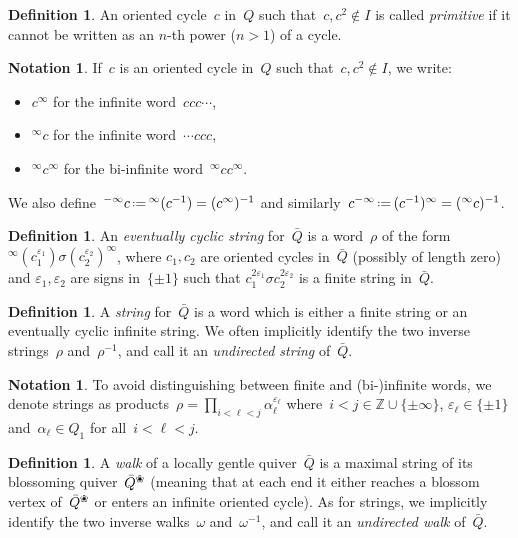 \documentclass{amsart}
\theoremstyle{definition}
\newtheorem{definition}[theorem]{Definition}
\newtheorem{notation}[theorem]{Notation}
\newcommand{\Z}{\mathbb{Z}} %
\newcommand{\eqdef}{\mbox{\,\raisebox{0.2ex}{\scriptsize\ensuremath{\mathrm:}}\ensuremath{=}\,}} %
\newcommand{\darkblue}{\color{darkblue}} %
\newcommand{\defn}[1]{\textsl{\darkblue #1}} %
\newcommand{\blossom}{^\text{\ding{96}}} %
\begin{document}
\begin{definition}
An oriented cycle~$c$ in~$Q$ such that~$c, c^2 \notin I$ is called \defn{primitive} if it cannot be written as an $n$-th power ($n>1$) of a cycle.
\end{definition}

\begin{notation}
If~$c$ is an oriented cycle in~$Q$ such that~$c, c^2 \notin I$, we write:
\begin{itemize}
\item $c^\infty$ for the infinite word~$c c c\cdots$,
\item ${}^\infty c$ for the infinite word~$\cdots c c c$,
\item $^\infty c^\infty$ for the bi-infinite word~$^\infty c c^\infty$.
\end{itemize}
We also define~${}^{-\infty}c \eqdef {}^{\infty}(c^{-1}) = (c^\infty)^{-1}$ and similarly~$c^{-\infty} \eqdef (c^{-1})^\infty = (^\infty c)^{-1}$.
\end{notation}

\begin{definition}
An \defn{eventually cyclic string} for~$\bar Q$ is a word~$\rho$ of the form~${}^\infty(c_1^{\varepsilon_1})\sigma (c_2^{\varepsilon_2})^\infty$, where $c_1, c_2$ are oriented cycles in~$\bar Q$ (possibly of length zero) and $\varepsilon_1, \varepsilon_2$ are signs in~$\{\pm 1\}$ such that $c_1^{2\varepsilon_1} \sigma c_2^{2\varepsilon_2}$ is a finite string in~$\bar Q$.
\end{definition}

\begin{definition}
A \defn{string} for~$\bar Q$ is a word which is either a finite string or an eventually cyclic infinite string.
We often implicitly identify the two inverse strings~$\rho$ and~$\rho^{-1}$, and call it an \defn{undirected string} of~$\bar Q$.
\end{definition}

\begin{notation}
To avoid distinguishing between finite and (bi-)infinite words, we denote strings as products~$\rho = \prod_{i < \ell < j} \alpha_\ell^{\varepsilon_\ell}$ where~$i < j \in \Z \cup \{\pm \infty\}$, $\varepsilon_\ell\in\{\pm 1\}$ and~$\alpha_\ell \in Q_1$ for all~$i < \ell < j$.
\end{notation}

\begin{definition}
\label{def:walk}
A \defn{walk} of a locally gentle quiver~$\bar Q$ is a maximal string of its blossoming quiver~$\bar Q \blossom$ (meaning that at each end it either reaches a blossom vertex of~$\bar Q \blossom$ or enters an infinite oriented cycle).
As for strings, we implicitly identify the two inverse walks~$\omega$ and~$\omega^{-1}$, and call it an \defn{undirected walk} of~$\bar Q$.
\end{definition}
\end{document}
